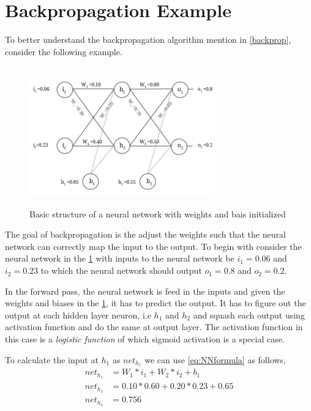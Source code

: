 \label{ch:appedix}
\section{Backpropagation Example}

To better understand the backpropagation algorithm mention in \ref{backprop}, consider the following example.

\begin{figure}[!ht]
    \centering
    \includegraphics[width=8cm,height=6cm, keepaspectratio]{pics/BackpropExample.jpg}
    \caption{Basic structure of a neural network with weights and bais initialized}
    \label{fig:bakprop}
\end{figure}

The goal of backpropagation is the adjust the weights such that the neural network can correctly map the input to the output. To begin with consider the neural network in the \ref{fig:bakprop} with inputs to the neural network be $i_{1} = 0.06$ and $i_{2} = 0.23$ to which the neural network should output $o_{1}=0.8$ and $o_{2}=0.2$.

In the forward pass, the neural network is feed in the inputs and given the weights and biases in the \ref{fig:bakprop}, it has to predict the output. It has to figure out the output at each hidden layer neuron, i.e $h_{1}$ and $h_{2}$ and squash each output using activation function and do the same at output layer. The activation function in this case is a \textit{logistic function} of which sigmoid activation is a special case.

To calculate the input at $h_{1}$ as $net_{h_{1}}$ we can use \ref{eq:NNformula} as follows,
\begin{align}
    net_{h_{1}} &= W_{1} * i_{1} + W_{2} * i_{2} +b_{1}\\
    net_{h_{1}} &= 0.10 * 0.60 + 0.20 * 0.23 + 0.65 \\
    net_{h_{1}} &= 0.756 \label{eq:endH1}
\end{align}

